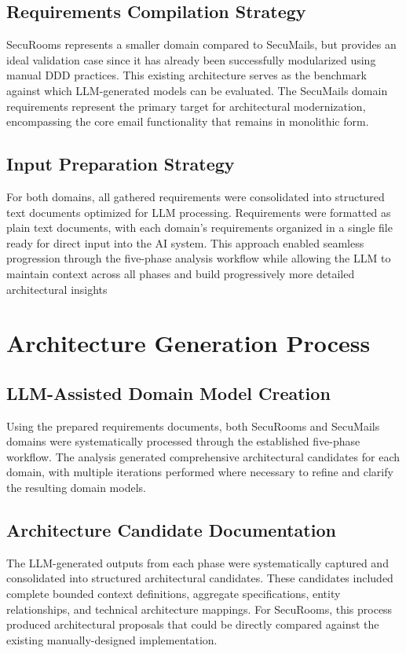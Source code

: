 \subsection{Requirements Compilation Strategy}
SecuRooms represents a smaller domain compared to SecuMails, but provides an ideal validation case since it has already been successfully modularized using manual DDD practices. This existing architecture serves as the benchmark against which LLM-generated models can be evaluated. The SecuMails domain requirements represent the primary target for architectural modernization, encompassing the core email functionality that remains in monolithic form.

\subsection{Input Preparation Strategy}
For both domains, all gathered requirements were consolidated into structured text documents optimized for LLM processing. Requirements were formatted as plain text documents, with each domain's requirements organized in a single file ready for direct input into the AI system. This approach enabled seamless progression through the five-phase analysis workflow while allowing the LLM to maintain context across all phases and build progressively more detailed architectural insights

\section{Architecture Generation Process}
\subsection{LLM-Assisted Domain Model Creation}
Using the prepared requirements documents, both SecuRooms and SecuMails domains were systematically processed through the established five-phase workflow. The analysis generated comprehensive architectural candidates for each domain, with multiple iterations performed where necessary to refine and clarify the resulting domain models.

\subsection{Architecture Candidate Documentation}
The LLM-generated outputs from each phase were systematically captured and consolidated into structured architectural candidates. These candidates included complete bounded context definitions, aggregate specifications, entity relationships, and technical architecture mappings. For SecuRooms, this process produced architectural proposals that could be directly compared against the existing manually-designed implementation.

